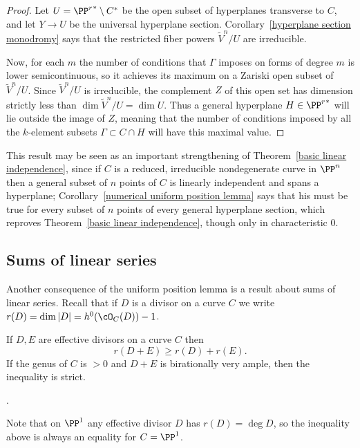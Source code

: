 \begin{proof} Let $U = {\PP^r}^* \setminus C^*$ be the open subset of hyperplanes transverse to $C$, and let $Y\to U$ be the universal hyperplane section.
Corollary~\ref{hyperplane section monodromy} says that the restricted fiber powers $\tilde V^n/U$ are irreducible.

Now, for each $m$ the number of conditions that $\Gamma$ imposes on forms of degree $m$ is lower semicontinuous, so it achieves its maximum on a Zariski open subset of $\tilde V^n/U$. Since $\tilde V^n/U$ is irreducible, the complement $Z$ of this open set has dimension strictly less than $\dim \tilde V^n/U = \dim U$. Thus a general hyperplane $H \in {\PP^r}^*$ will lie outside the image of $Z$, meaning that the number of conditions imposed by all the $k$-element subsets $\Gamma \subset C \cap H$ will have this maximal value.
\end{proof}

This result may be seen as an important strengthening of Theorem~\ref{basic linear independence}, since if $C$ is a reduced, irreducible nondegenerate curve in $\PP^n$ then a general subset of $n$ points of $C$ is linearly independent and spans a hyperplane; Corollary~\ref{numerical uniform position lemma} says that his must
be true for every subset of $n$ points of every general hyperplane section, 
which reproves Theorem~\ref{basic linear independence}, though only in characteristic 0. 

\subsection{Sums of linear series}

Another consequence of the uniform position lemma is a result about sums of linear series.
Recall that if $D$ is a divisor on a curve $C$ we write $r(D) = \dim |D| = h^0(\cO_C(D))-1$.

\begin{corollary}\label{Clifford equality plus}
If $D,E$ are effective divisors on a curve $C$ then
$$
r(D+E) \geq r(D)+r(E).
$$
If the genus of $C$ is $>0$ and $D+E$ is birationally very ample, then the inequality is strict.
\end{corollary}.

Note that on $\PP^1$ any effective divisor $D$ has $r(D) = \deg D$, so the inequality above is
always an equality for $C = \PP^1$.

